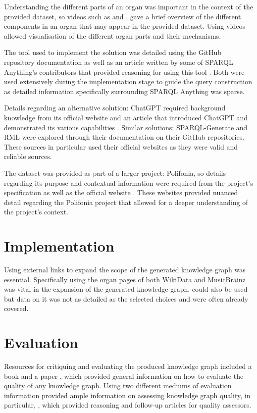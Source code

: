 Understanding the different parts of an organ was important in the context of the provided dataset, so videos such as \cite{organvideo} and \cite{organvideo1}, gave a brief overview of the different components in an organ that may appear in the provided dataset. Using videos allowed visualisation of the different organ parts and their mechanisms.   

The tool used to implement the solution was detailed using the GitHub repository documentation \cite{sparqlanythinggithub} as well as an article written by some of SPARQL Anything's contributors that provided reasoning for using this tool \cite{sparqlanything}. Both were used extensively during the implementation stage to guide the query construction as detailed information specifically surrounding SPARQL Anything was sparse. 

Details regarding an alternative solution: ChatGPT required background knowledge from its official website \cite{chatgptwebsite} and an article that introduced ChatGPT and demonstrated its various capabilities \cite{chatgpt}. Similar solutions: SPARQL-Generate \cite{sparqlgenerate} and RML \cite{rml} were explored through their documentation on their GitHub repositories. These sources in particular used their official websites as they were valid and reliable sources. 

The dataset was provided as part of a larger project: Polifonia, so details regarding its purpose and contextual information were required from the project's specification \cite{polifoniaproject} as well as the official website \cite{polifonia}. These websites provided nuanced detail regarding the Polifonia project that allowed for a deeper understanding of the project's context. 

\section{Implementation}
\hspace{0.5cm} Using external links to expand the scope of the generated knowledge graph was essential. Specifically using the organ pages of both WikiData \cite{organwikidata} and MusicBrainz \cite{organmusicbrainz} was vital in the expansion of the generated knowledge graph. \cite{organdbpedia} could also be used but data on it was not as detailed as the selected choices and were often already covered.

\section{Evaluation}
\hspace{0.5cm} Resources for critiquing and evaluating the produced knowledge graph included a book \cite{knowledgegraphevaulationbook} and a paper \cite{evaluationpaper}, which provided general information on how to evaluate the quality of any knowledge graph. Using two different mediums of evaluation information provided ample information on assessing knowledge graph quality, in particular, \cite{evaluationpaper}, which provided reasoning and follow-up articles for quality assessors. 

